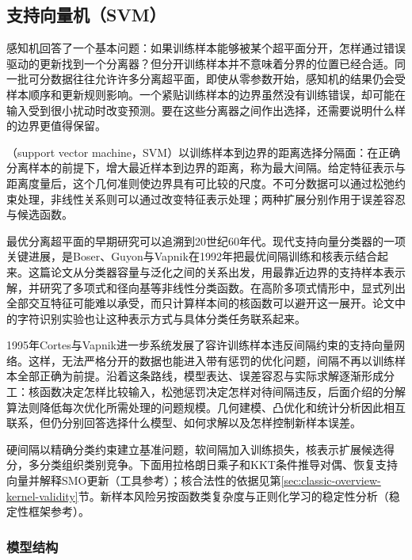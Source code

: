 \subsection{支持向量机（SVM）}
\label{sec:classification-svm}

感知机回答了一个基本问题：如果训练样本能够被某个超平面分开，怎样通过错误驱动的更新找到一个分离器？但分开训练样本并不意味着分界的位置已经合适。同一批可分数据往往允许许多分离超平面，即使从零参数开始，感知机的结果仍会受样本顺序和更新规则影响。一个紧贴训练样本的边界虽然没有训练错误，却可能在输入受到很小扰动时改变预测。要在这些分离器之间作出选择，还需要说明什么样的边界更值得保留。

（support vector machine，SVM）以训练样本到边界的距离选择分隔面：在正确分离样本的前提下，增大最近样本到边界的距离，称为最大间隔。给定特征表示与距离度量后，这个几何准则使边界具有可比较的尺度。不可分数据可以通过松弛约束处理，非线性关系则可以通过改变特征表示处理；两种扩展分别作用于误差容忍与候选函数。

最优分离超平面的早期研究可以追溯到20世纪60年代。现代支持向量分类器的一项关键进展，是Boser、Guyon与Vapnik在1992年把最优间隔训练和核表示结合起来。这篇论文从分类器容量与泛化之间的关系出发，用最靠近边界的支持样本表示解，并研究了多项式和径向基等非线性分类函数。在高阶多项式情形中，显式列出全部交互特征可能难以承受，而只计算样本间的核函数可以避开这一展开。论文中的字符识别实验也让这种表示方式与具体分类任务联系起来。

1995年Cortes与Vapnik进一步系统发展了容许训练样本违反间隔约束的支持向量网络。这样，无法严格分开的数据也能进入带有惩罚的优化问题，间隔不再以训练样本全部正确为前提。沿着这条路线，模型表达、误差容忍与实际求解逐渐形成分工：核函数决定怎样比较输入，松弛惩罚决定怎样对待间隔违反，后面介绍的分解算法则降低每次优化所需处理的问题规模。几何建模、凸优化和统计分析因此相互联系，但仍分别回答选择什么模型、如何求解以及怎样控制新样本误差。

硬间隔以精确分类约束建立基准问题，软间隔加入训练损失，核表示扩展候选得分，多分类组织类别竞争。下面用拉格朗日乘子和KKT条件推导对偶、恢复支持向量并解释SMO更新（工具参考）；核合法性的依据见第\ref{sec:classic-overview-kernel-validity}节。新样本风险另按函数类复杂度与正则化学习的稳定性分析（稳定性框架参考）。

\subsubsection{模型结构}
\label{sec:classification-svm-model}

